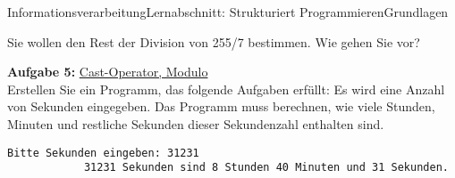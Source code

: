 \documentclass[oneside,openany,headings=optiontotoc,11pt,numbers=noenddot]{scrreprt}
\begin{document}
\begin{worksheet}{Informationsverarbeitung}{Lernabschnitt: Strukturiert Programmieren}{Grundlagen}
\begin{framed}
			Sie wollen den Rest der Division von 255/7 bestimmen. Wie gehen Sie vor?\\
			\par\noindent
			\textbf{Aufgabe 5:} \underline{Cast-Operator, Modulo}\\
			Erstellen Sie ein Programm, das folgende Aufgaben erfüllt: Es wird eine Anzahl von Sekunden eingegeben. Das Programm muss berechnen, wie viele Stunden, Minuten und restliche Sekunden dieser Sekundenzahl enthalten sind.
			\begin{lstlisting}[style=Python]
			Bitte Sekunden eingeben: 31231
			31231 Sekunden sind 8 Stunden 40 Minuten und 31 Sekunden.
			\end{lstlisting}
		\end{framed}
	\end{worksheet}
\end{document}
